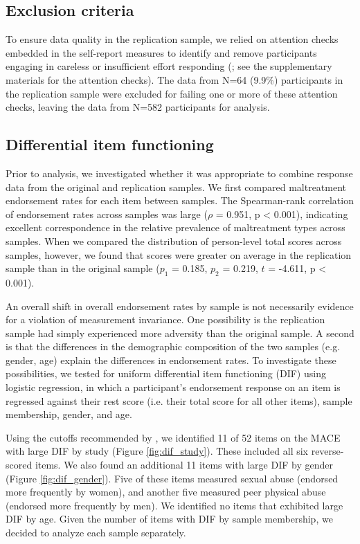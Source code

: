 \documentclass[letterpaper,man,natbib,floatsintext,longtable]{apa6}
\begin{document}
\subsection{Exclusion criteria}

To ensure data quality in the replication sample, we relied on attention checks embedded in the self-report measures to identify and remove participants engaging in careless or insufficient effort responding (\citealt{zorowitz2021inattentive}; see the supplementary materials for the attention checks). The data from N=64 (9.9\%)  participants in the replication sample were excluded for failing one or more of these attention checks, leaving the data from N=582 participants for analysis.

\subsection{Differential item functioning}

Prior to analysis, we investigated whether it was appropriate to combine response data from the original and replication samples. We first compared maltreatment endorsement rates for each item between samples. The Spearman-rank correlation of endorsement rates across samples was large ($\rho$ = 0.951, p < 0.001), indicating excellent correspondence in the relative prevalence of maltreatment types across samples. When we compared the distribution of person-level total scores across samples, however, we found that scores were greater on average in the replication sample than in the original sample ($p_1$ = 0.185, $p_2$ = 0.219, $t$ = -4.611, p < 0.001). 

An overall shift in overall endorsement rates by sample is not necessarily evidence for a violation of measurement invariance. One possibility is the replication sample had simply experienced more adversity than the original sample. A second is that the differences in the demographic composition of the two samples (e.g. gender, age) explain the differences in endorsement rates. To investigate these possibilities, we tested for uniform differential item functioning (DIF) using logistic regression, in which a participant's endorsement response on an item is regressed against their rest score (i.e. their total score for all other items), sample membership, gender, and age.

Using the cutoffs recommended by \cite{hidalgo2014binary}, we identified 11 of 52 items on the MACE with large DIF by study (Figure \ref{fig:dif_study}). These included all six reverse-scored items. We also found an additional 11 items with large DIF by gender (Figure \ref{fig:dif_gender}). Five of these items measured sexual abuse (endorsed more frequently by women), and another five measured peer physical abuse (endorsed more frequently by men). We identified no items that exhibited large DIF by age. Given the number of items with DIF by sample membership, we decided to analyze each sample separately.
\end{document}
